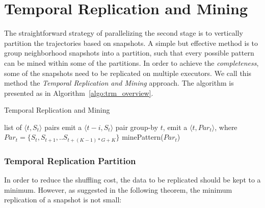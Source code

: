 

\section{Temporal Replication and Mining}
The straightforward strategy of parallelizing the second stage is to vertically partition the trajectories based on snapshots. 
A simple but effective method
is to group neighborhood snapshots into a partition, such that every possible pattern can be mined within some of the partitions. In order to achieve the \emph{completeness},
some of the snapshots need to be replicated on multiple executors.
We call this method the \emph{Temporal Replication and Mining} approach. 
The algorithm is presented as in Algorithm~\ref{algo:trm_overview}.

\begin{algorithm}
\caption{Temporal Replication and Mining}
\label{algo:trm_overview}
\begin{algorithmic}
\Require list of $\langle t, S_t \rangle$ pairs
		\State emit a $\langle t-i, S_t \rangle$ pair
	\EndFor 
\EndFor
{}
\State group-by $t$, emit a $\langle t, Par_t\rangle$,
\State  where $Par_t = \{S_t, S_{t+1}, .. S_{t+(K-1)*G+K}\} $
\EndFor
{}
\State minePattern($Par_t$)
\EndFor

\end{algorithmic}
\end{algorithm}


\subsubsection{Temporal Replication Partition}
In order to reduce the shuffling cost, the data to be replicated should be
kept to a minimum. However, as suggested in the following theorem, the minimum replication of a snapshot is not small:

